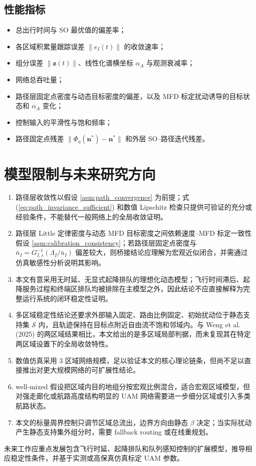 \documentclass[a4paper,12pt]{article}
\theoremstyle{plain}
\theoremstyle{definition}
\theoremstyle{remark}
\begin{document}
\subsection{性能指标}
\begin{itemize}
    \item 总出行时间与 SO 最优值的偏差率；
    \item 各区域积累量跟踪误差 $\|e_I(t)\|$ 的收敛速率；
    \item 组分误差 $\|\bm z(t)\|$、线性化谱横坐标 $\alpha_A$ 与观测衰减率；
    \item 网络总吞吐量；
    \item 路径层固定点密度与动态目标密度的偏差，以及 MFD 标定扰动诱导的目标状态和 $\alpha_A$ 变化；
    \item 控制输入的平滑性与饱和频率；
    \item 路径固定点残差 $\|\Phi_\eta(\bm n^*)-\bm n^*\|$ 和外层 SO--路径迭代残差。
\end{itemize}

\section{模型限制与未来研究方向}

\begin{enumerate}
    \item 路径层收敛性以假设 \ref{asm:path_convergence} 为前提；式 (\ref{eq:path_invariance_sufficient}) 和数值 Lipschitz 检查只提供可验证的充分或经验条件，不能替代一般网络上的全局收敛证明。
    \item 路径层 Little 定律密度与动态 MFD 目标密度之间依赖速度--MFD 标定一致性假设 \ref{asm:calibration_consistency}；若路径层固定点密度与 $\bar n_I=G_{I,s}^{-1}(\Lambda_I/\bar u_I)$ 偏差较大，则桥接结论应理解为宏观近似闭合，并需通过仿真敏感性分析说明其影响。
    \item 本文有意采用无时延、无显式起降排队的理想化动态模型；飞行时间滞后、起降服务过程和终端区排队均被排除在主模型之外，因此结论不应直接解释为完整运行系统的闭环稳定性证明。
    \item 多区域稳定性结论还要求外部输入固定、路由比例固定、初始扰动位于静态支持集 $\mathcal S$ 内，且轨迹保持在目标点附近自由流不饱和邻域内。与 Weng et al. (2025) 的两区域结果相比，本文给出的是多区域局部判据，而未复现其在特定两区域设置下的全局收敛特性。
    \item 数值仿真采用 3 区域网络规模，足以验证本文的核心理论链条，但尚不足以直接推出对更大规模网络的可扩展性结论。
    \item well-mixed 假设把区域内目的地组分按宏观比例混合，适合宏观区域模型，但对强走廊化或航路高度结构明显的 UAM 网络需要进一步细分区域或引入多类航路状态。
    \item 本文的标量周界控制只调节区域总流出，边界方向由静态 $\beta$ 决定；当实际扰动产生静态支持集外组分时，需要 fallback routing 或在线重规划。
\end{enumerate}

未来工作应重点发展包含飞行时延、起降排队和队列感知控制的扩展模型，推导相应稳定性条件，并基于实测或高保真仿真标定 UAM 参数。
\end{document}
